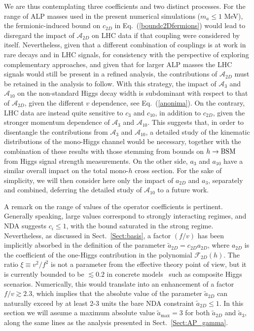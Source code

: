 \documentclass[11pt]{article}
\newcommand{\A}{\mathcal{A}}
\newcommand{\F}{\mathcal{F}}
\newcommand{\at}{\tilde{a}}
\renewcommand{\max}{\mathrm{max}}
\renewcommand{\to}{\rightarrow}
\renewcommand{\[}{\begin{equation}}
\renewcommand{\]}{\end{equation}}
\begin{document}
We are thus contemplating three coefficients and two distinct processes.  For the range of ALP masses used in the present numerical simulations ($m_a\le 1$ MeV), the fermionic-induced bound  on $c_{2D}$ in Eq.~(\ref{boundc2Dfermions}) would lead to disregard the impact of $\A_{2D}$ on   LHC data if that coupling were considered by itself. Nevertheless, given that a different combination of couplings is at work in rare decays and in LHC signals, for consistency with the perspective of exploring complementary approaches, and given that for larger ALP masses  the LHC signals would still be present in a refined analysis, the contributions of $\A_{2D}$ must be retained in the analysis to follow.
 With this strategy, the impact of $\A_3$ and $\A_{10}$  on the non-standard Higgs decay width is subdominant 
with respect to that of $\A_{2D}$, given the different $v$ dependence, see Eq.~(\ref{anonima}).
On the contrary, LHC data are instead quite sensitive to $c_3$ and $c_{10}$, 
in addition to $c_{2D}$, given the stronger momentum dependence of $\A_3$ and $\A_{10}$. 
 This suggests that, in order to disentangle the  contributions  from $\A_3$ and $\A_{10}$,  a detailed study of the kinematic 
 distributions of the mono-Higgs channel would be necessary, together with the combination of these results with those stemming from bounds on $h\to {\rm BSM}$  from Higgs signal strength measurements. On the other side, $a_3$ and $a_{10}$ have a similar overall impact on the total mono-$h$ cross section. For the sake of simplicity, we will then 
 consider here only the impact of $a_{2D}$ and $a_3$, separately and combined, deferring the detailed study of $\A_{10}$  to a future work. 


A remark on the range of values of the operator coefficients is pertinent. Generally speaking, large values  
correspond to strongly interacting regimes, and NDA suggests  $c_{i}\leq 1$, with the bound saturated in the strong regime. Nevertheless, as discussed in 
Sect.~\ref{Sect:basis}, a factor $(f/v)$ has been implicitly absorbed  in the definition of the parameter $\at_{2D} = c_{2D}a_{2D}$, where $a_{2D}$ is 
the coefficient of the one-Higgs contribution in the polynomial $\F_{2D}(h)$.  The ratio $\xi\equiv v^2/f^2$ is not a parameter from the effective theory point of 
view, but it is currently bounded to be $\lesssim0.2$ in concrete models~\cite{deFlorian:2016spz} such as composite Higgs scenarios. Numerically, 
this would translate into an enhancement of a factor $f/v\gtrsim 2.3$, which implies that the absolute value of the parameter $\at_{2D}$ can 
naturally exceed by at least 2-3 units the bare NDA constraint $\at_{2D}\leq 1$. In this section we will assume a maximum absolute value $\tilde{a}_\max = 3$ 
for both $\at_{2D}$ and $\at_3$, along the same lines as the analysis presented in Sect.~\ref{Sect:AP_gamma}.
\end{document}
